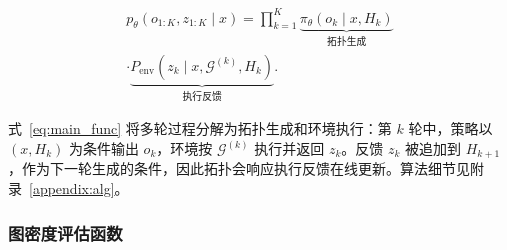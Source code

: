 \documentclass{article}
\theoremstyle{definition}
\begin{document}
\begin{multline}\label{eq:main_func}
p_\theta(o_{1:K},z_{1:K}\mid x)
=\prod_{k=1}^{K}
\underbrace{\pi_\theta\!\left(o_k \mid x,H_k\right)}_{\text{拓扑生成}}
\\ \cdot
\underbrace{P_{\text{env}}\!\left(z_k \mid x,\mathcal{G}^{(k)},H_k\right)}_{\text{执行反馈}} .
\end{multline}

式~\ref{eq:main_func} 将多轮过程分解为拓扑生成和环境执行：第 $k$ 轮中，策略以 $(x,H_k)$ 为条件输出 $o_k$，环境按 $\mathcal{G}^{(k)}$ 执行并返回 $z_k$。反馈 $z_k$ 被追加到 $H_{k+1}$，作为下一轮生成的条件，因此拓扑会响应执行反馈在线更新。算法细节见附录~\ref{appendix:alg}。
\subsubsection{图密度评估函数}
\label{graph:g_c}
\end{document}
